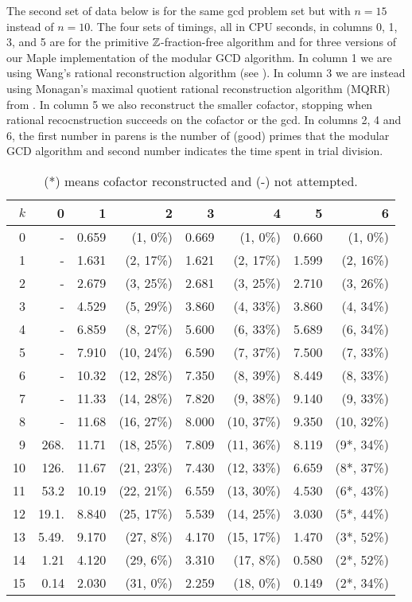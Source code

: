 \documentclass[10pt]{article}
\begin{document}
The second set of data below is for the same gcd problem set but
with $n=15$ instead of $n=10$. The four sets of timings, all in CPU
seconds, in columns 0, 1, 3, and 5 are for the primitive
${\mathbb Z}$-fraction-free algorithm and for three versions of our Maple
implementation of the modular GCD algorithm. In column 1 we are
using Wang's rational reconstruction algorithm (see \cite{Wang81}).
In column 3 we are instead using Monagan's maximal quotient rational
reconstruction algorithm (MQRR) from \cite{MQRR}. In column 5 we
also reconstruct the smaller cofactor, stopping when rational
recocnstruction succeeds on the cofactor or the gcd. In columns 2, 4
and 6, the first number in parens is the number of (good) primes
that the modular GCD algorithm and second number indicates the time
spent in trial division.

\begin{table}[htb]
\begin{center}
\begin{tabular}{r r | r r | r r | r r}
$k$& 0    &    1  &  2         &    3   &  4         &    5   & 6    \\ \hline
0& -     & 0.659 &(1, 0\%)  &  0.669 &(1, 0\%)   & 0.660 & (1, 0\%)  \\
1& -     & 1.631 &(2, 17\%) &  1.621 &(2, 17\%)  & 1.599 &(2, 16\%)  \\
2& -     & 2.679 &(3, 25\%) &  2.681 &(3, 25\%)  & 2.710 &(3, 26\%)  \\
3& -     & 4.529 &(5, 29\%) &  3.860 &(4, 33\%)  & 3.860 &(4, 34\%)  \\
4& -     & 6.859 &(8, 27\%) &  5.600 &(6, 33\%)  & 5.689 &(6, 34\%)  \\
5& -     & 7.910 &(10, 24\%)&  6.590 &(7, 37\%)  & 7.500 &(7, 33\%)  \\
6& -     & 10.32 &(12, 28\%)&  7.350 &(8, 39\%)  & 8.449 &(8, 33\%)  \\
7& -     & 11.33 &(14, 28\%)&  7.820 &(9, 38\%)  & 9.140 &(9, 33\%)  \\
8& -     & 11.68 &(16, 27\%)&  8.000 &(10, 37\%) & 9.350 &(10, 32\%)  \\
9&  268. & 11.71 &(18, 25\%)&  7.809 &(11, 36\%) & 8.119 &(9*, 34\%)  \\
10& 126. & 11.67 &(21, 23\%)&  7.430 &(12, 33\%) & 6.659 &(8*, 37\%)  \\
11& 53.2 & 10.19 &(22, 21\%)&  6.559 &(13, 30\%) & 4.530 &(6*, 43\%)  \\
12& 19.1.& 8.840 &(25, 17\%)&  5.539 &(14, 25\%) & 3.030 &(5*, 44\%)  \\
13& 5.49.& 9.170 &(27, 8\%) &  4.170 &(15, 17\%) & 1.470 &(3*, 52\%)  \\
14& 1.21 & 4.120 &(29, 6\%) &  3.310 &(17, 8\%)  & 0.580 &(2*, 52\%)  \\
15& 0.14 & 2.030 &(31, 0\%) &  2.259 &(18, 0\%)  & 0.149 &(2*, 34\%)  \\ \hline
\end{tabular}
\caption{(*) means cofactor reconstructed and (-) not attempted.}
\end{center}
\end{table}
\end{document}
